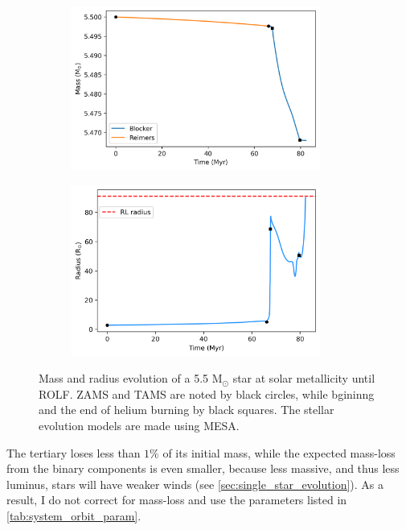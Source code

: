 \begin{figure}[H]
    \centering
    \begin{subfigure}{.5\textwidth}
    \centering
    \includegraphics[width=0.9\textwidth]{Thesis/graphs/giant_1-1mass_loss.pdf}
    \label{fig:mass_loss}
    \end{subfigure}%
    \begin{subfigure}{.5\textwidth}
    \centering
    \includegraphics[width=0.9\textwidth]{Thesis/graphs/giant_1-1radius.pdf}
    \label{fig:radius_profile}
    \end{subfigure}
    \caption{ Mass and radius evolution of a 5.5 M$_{\odot}$ star at solar metallicity until ROLF. ZAMS and TAMS are noted by black circles, while bgininng and the end of helium burning by black squares. The stellar evolution models are made using MESA\citep{paxton2010modules,paxton2013modules,paxton2015modules,paxton2019modules}.}
\end{figure}

The tertiary loses less than $1\%$ of its 
initial mass, while the expected mass-loss from the binary components is even smaller, because less massive, and thus less luminus, stars will have weaker winds (see \cref{sec:single_star_evolution}). As a result, I do not correct for mass-loss and use the parameters listed in  \cref{tab:system_orbit_param}.

